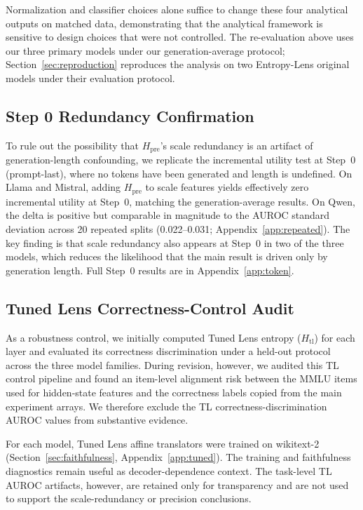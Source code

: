 \documentclass{ieeeaccess}
\newcommand{\Hpre}{H_{\text{pre}}}
\newcommand{\Htl}{H_{\text{tl}}}
\begin{document}
Normalization and classifier choices alone suffice to change these four analytical outputs on matched data, demonstrating that the analytical framework is sensitive to design choices that were not controlled. The re-evaluation above uses our three primary models under our generation-average protocol; Section~\ref{sec:reproduction} reproduces the analysis on two Entropy-Lens original models under their evaluation protocol.

\FloatBarrier
\subsection{Step 0 Redundancy Confirmation}
\label{sec:step0_redundancy}

To rule out the possibility that $\Hpre$'s scale redundancy is an artifact of generation-length confounding, we replicate the incremental utility test at Step~0 (prompt-last), where no tokens have been generated and length is undefined. On Llama and Mistral, adding $\Hpre$ to scale features yields effectively zero incremental utility at Step~0, matching the generation-average results. On Qwen, the delta is positive but comparable in magnitude to the AUROC standard deviation across 20 repeated splits (0.022--0.031; Appendix~\ref{app:repeated}). The key finding is that scale redundancy also appears at Step~0 in two of the three models, which reduces the likelihood that the main result is driven only by generation length. Full Step~0 results are in Appendix~\ref{app:token}.

\subsection{Tuned Lens Correctness-Control Audit}
\label{sec:tl_control}

As a robustness control, we initially computed Tuned Lens entropy ($\Htl$) for each layer and evaluated its correctness discrimination under a held-out protocol across the three model families. During revision, however, we audited this TL control pipeline and found an item-level alignment risk between the MMLU items used for hidden-state features and the correctness labels copied from the main experiment arrays. We therefore exclude the TL correctness-discrimination AUROC values from substantive evidence.

For each model, Tuned Lens affine translators were trained on wikitext-2 (Section~\ref{sec:faithfulness}, Appendix~\ref{app:tuned}). The training and faithfulness diagnostics remain useful as decoder-dependence context. The task-level TL AUROC artifacts, however, are retained only for transparency and are not used to support the scale-redundancy or precision conclusions.
\end{document}
